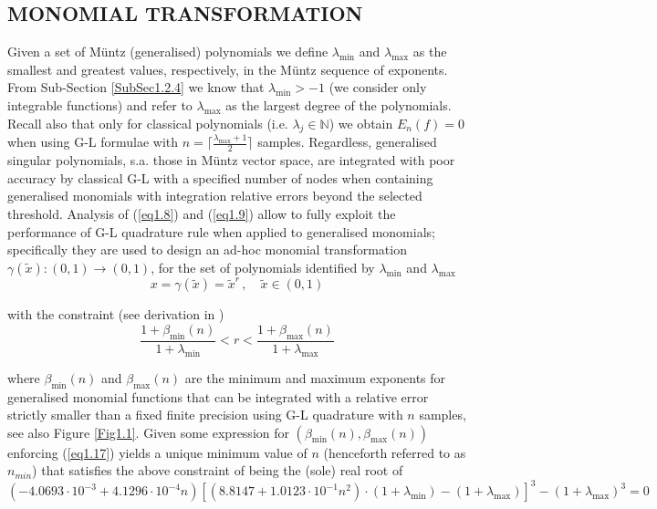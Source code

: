 \documentclass[a4paper, twosided]{book}
\begin{document}
\subsection[Monomial transformation]{\changefont MONOMIAL TRANSFORMATION}\label{SubSec1.2.6}

Given a set of Müntz (generalised) polynomials we define $\lambda_{\text{min}}$ and $\lambda_{\text{max}}$ as the smallest and greatest values, respectively, in the Müntz sequence of exponents. From Sub-Section \ref{SubSec1.2.4} we know that $\lambda_{\text{min}}>-1$ (we consider only integrable functions) and refer to $\lambda_{\text{max}}$ as the largest degree of the polynomials. Recall also that only for classical polynomials (i.e. $\lambda_j\in\mathbb{N}$) we obtain $E_n(f)=0$ when using G-L formulae with $n = \lceil \frac{\lambda_{\text{max}}+1}{2} \rceil$ samples. Regardless, generalised singular polynomials, s.a. those in Müntz vector space, are integrated with poor accuracy by classical G-L with a specified number of nodes when containing generalised monomials with integration relative errors beyond the selected threshold. Analysis of (\ref{eq1.8}) and (\ref{eq1.9}) allow to fully exploit the performance of G-L quadrature rule when applied to generalised monomials; specifically they are used to design an ad-hoc monomial transformation $\gamma(\tilde{x}):(0,1)\to(0,1)$, for the set of polynomials identified by $\lambda_{\text{min}}$ and $\lambda_{\text{max}}$
\begin{equation}\label{eq1.16}
    x = \gamma(\tilde{x}) = \tilde{x}^r\,,\quad\tilde{x}\in(0,1)
\end{equation}

\noindent
with the constraint (see derivation in \cite{Lombardi09, Lombardi21})
\begin{equation}\label{eq1.17}
    \frac{1+\beta_{\text{min}}(n)}{1+\lambda_{\text{min}}} < r < \frac{1+\beta_{\text{max}}(n)}{1+\lambda_{\text{max}}}
\end{equation}

\noindent
where $\beta_{\text{min}}(n)$ and $\beta_{\text{max}}(n)$ are the minimum and maximum exponents for generalised monomial functions that can be integrated with a relative error strictly smaller than a fixed finite precision using G-L quadrature with $n$ samples, see also Figure \ref{Fig1.1}. Given some expression for $(\beta_{\text{min}}(n),\beta_{\text{max}}(n))$ enforcing (\ref{eq1.17}) yields a unique minimum value of $n$ (henceforth referred to as $n_{min}$) that satisfies the above constraint of being the (sole) real root of
\begin{equation}\label{eq1.18}
    (-4.0693\cdot10^{-3}+4.1296\cdot10^{-4}n)[(8.8147+1.0123\cdot10^{-1}n^2)\cdot(1+\lambda_{\text{min}})-(1+\lambda_{\text{max}})]^3 - (1+\lambda_{\text{max}})^3=0
\end{equation}
\end{document}
